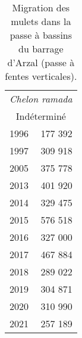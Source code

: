 \begin{table}[ht]
\centering
\begin{tabular}{lr}
  \toprule
  \multicolumn{2}{c}{\textit{Chelon ramada}}  \\ 
						\multicolumn{2}{c}{Indéterminé} \\ \midrule
1996 & 177 392 \\ 
  1997 & 309 918 \\ 
  2005 & 375 778 \\ 
  2013 & 401 920 \\ 
  2014 & 329 475 \\ 
  2015 & 576 518 \\ 
  2016 & 327 000 \\ 
  2017 & 467 884 \\ 
  2018 & 289 022 \\ 
  2019 & 304 871 \\ 
  2020 & 310 990 \\ 
  2021 & 257 189 \\ 
   \bottomrule
\end{tabular}
\caption{Migration des mulets dans la passe à bassins du barrage d'Arzal 
				(passe à fentes verticales).} 
\label{table_bilanannuel_mulets}
\end{table}
